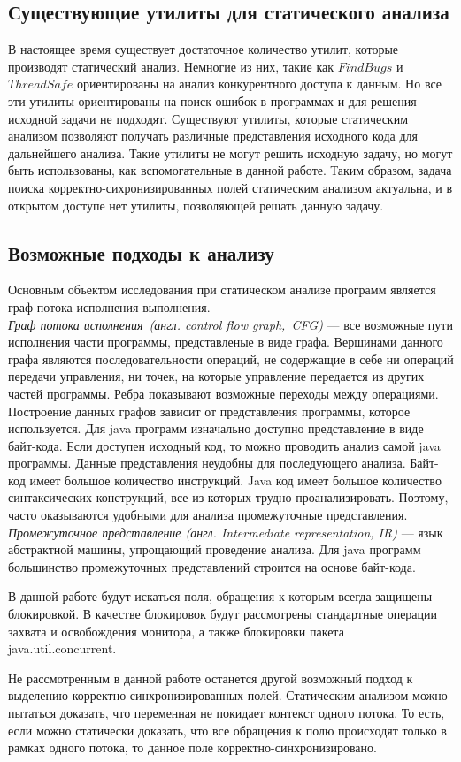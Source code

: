 \subsection{Существующие утилиты для статического анализа}
В настоящее время существует достаточное количество утилит, которые производят статический анализ. Немногие из них, такие как $FindBugs$ и $ThreadSafe$ ориентированы на анализ конкурентного доступа к данным. Но все эти утилиты ориентированы на поиск ошибок в программах и для решения исходной задачи не подходят.
Существуют утилиты, которые статическим анализом позволяют получать различные представления исходного кода для дальнейшего анализа. Такие утилиты не могут решить исходную задачу, но могут быть использованы, как вспомогательные в данной работе. 
Таким образом, задача поиска корректно-сихронизированных полей статическим анализом актуальна, и в открытом доступе нет утилиты, позволяющей решать данную задачу. 
\subsection{Возможные подходы к анализу}
Основным объектом исследования при статическом анализе программ является граф потока исполнения выполнения. 
\\\emph{Граф потока исполнения\ (англ. control flow graph,\ CFG)} --- все возможные пути исполнения части программы, представленые в виде графа. Вершинами данного графа являются последовательности операций, не содержащие в себе ни операций передачи управления, ни точек, на которые управление передается из других частей программы. Ребра показывают возможные переходы между операциями.
Построение данных графов зависит от представления программы, которое используется. Для java программ изначально 
доступно представление в виде байт-кода. Если доступен исходный код, то можно проводить анализ самой java программы.
Данные представления неудобны для последующего анализа. Байт-код имеет большое количество инструкций.  Java код имеет большое количество синтаксических конструкций, все из которых трудно проанализировать. Поэтому, часто оказываются удобными для анализа промежуточные представления.
\\\emph{Промежуточное представление (англ. Intermediate representation, IR)} --- язык абстрактной машины, упрощающий проведение анализа. Для java программ большинство промежуточных представлений строится на основе байт-кода.

В данной работе будут искаться поля, обращения к которым всегда защищены блокировкой. В качестве блокировок будут рассмотрены стандартные операции захвата и освобождения монитора, а также блокировки пакета java.util.concurrent.


Не рассмотренным в данной работе останется другой возможный подход к выделению корректно-синхронизированных полей.
Статическим анализом можно пытаться доказать, что переменная не покидает контекст одного потока. То есть, если можно статически доказать, что все обращения к полю происходят только в рамках одного потока, то данное поле корректно-синхронизировано.
\FloatBarrier
